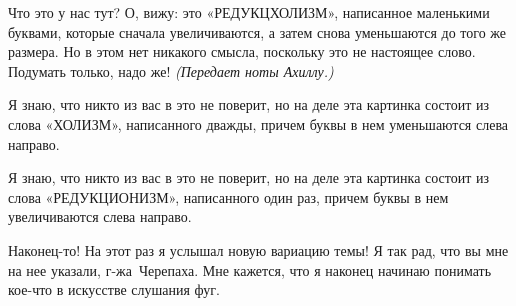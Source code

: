 \documentclass[../main.tex]{subfiles}
\begin{document}
\begin{dialogue}
 Что это у нас тут? О, вижу: это «РЕДУКЦХОЛИЗМ», написанное маленькими буквами, которые сначала увеличиваются, а затем снова уменьшаются до того же размера. Но в этом нет никакого смысла, поскольку это не настоящее слово. Подумать только, надо же! \emph{(Передает ноты Ахиллу.)}

 Я знаю, что никто из вас в это не поверит, но на деле эта картинка состоит из слова «ХОЛИЗМ», написанного дважды, причем буквы в нем уменьшаются слева направо.

 Я знаю, что никто из вас в это не поверит, но на деле эта картинка состоит из слова «РЕДУКЦИОНИЗМ», написанного один раз, причем буквы в нем увеличиваются слева направо.

 Наконец-то! На этот раз я услышал новую вариацию темы! Я так рад, что вы мне на нее указали, г-жа~Черепаха. Мне кажется, что я наконец начинаю понимать кое-что в искусстве слушания фуг.

\end{dialogue}
\end{document}
